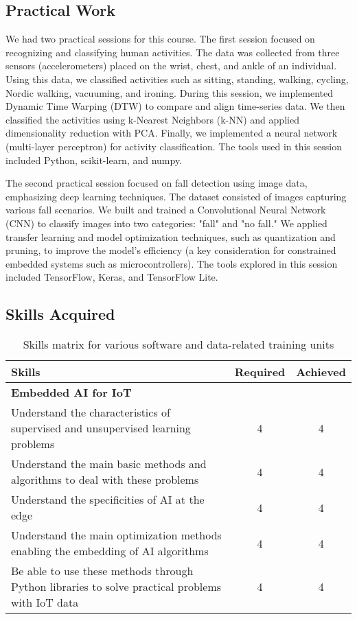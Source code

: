 \subsection{Practical Work}
\indent \indent We had two practical sessions for this course. The first session focused on recognizing and classifying human activities. 
The data was collected from three sensors (accelerometers) placed on the wrist, chest, and ankle of an individual. 
Using this data, we classified activities such as sitting, standing, walking, cycling, Nordic walking, vacuuming, and ironing.
During this session, we implemented Dynamic Time Warping (DTW) to compare and align time-series data. 
We then classified the activities using k-Nearest Neighbors (k-NN) and applied dimensionality reduction with PCA. 
Finally, we implemented a neural network (multi-layer perceptron) for activity classification. 
The tools used in this session included Python, scikit-learn, and numpy.

The second practical session focused on fall detection using image data, emphasizing deep learning techniques. 
The dataset consisted of images capturing various fall scenarios. 
We built and trained a Convolutional Neural Network (CNN) to classify images into two categories: "fall" and "no fall." 
We applied transfer learning and model optimization techniques, such as quantization and pruning, to improve the model's efficiency (a key consideration for constrained embedded systems such as microcontrollers). 
The tools explored in this session included TensorFlow, Keras, and TensorFlow Lite.

\subsection{Skills Acquired}
\begin{table}[H]
    \centering
    \renewcommand{\arraystretch}{1.5}
    \begin{tabular}{|p{11cm}|c|c|}
    \hline
    \rowcolor[gray]{0.8}
    \textbf{Skills} & \textbf{Required} & \textbf{Achieved} \\ \hline
    \rowcolor[gray]{0.9} \textbf{Embedded AI for IoT} &  &  \\ \hline
    Understand the characteristics of supervised and unsupervised learning problems & 4 & 4 \\ \hline
    Understand the main basic methods and algorithms to deal with these problems & 4 & 4 \\ \hline
    Understand the specificities of AI at the edge & 4 & 4 \\ \hline
    Understand the main optimization methods enabling the embedding of AI algorithms & 4 & 4 \\ \hline
    Be able to use these methods through Python libraries to solve practical problems with IoT data & 4 & 4 \\ \hline
    \end{tabular}
    \caption{Skills matrix for various software and data-related training units}
    \label{table:skills-embedded-ia}
\end{table}

